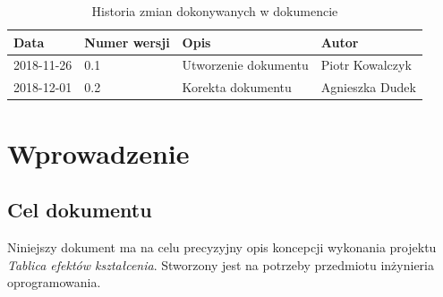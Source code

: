 \documentclass{article}
\begin{document}
\begin{titlepage}






\end{titlepage}

\addtocounter{page}{1}
\newpage

\begin{table}[h!]
	\begin{center}
		\caption{Historia zmian dokonywanych w dokumencie}
		\begin{tabular}{|l|l|l|l|}
			\hline
			Data & Numer wersji & Opis & Autor \\
			\hline \hline
			2018-11-26 & 0.1 & Utworzenie dokumentu & Piotr Kowalczyk \\
			\hline 
			2018-12-01 & 0.2 & Korekta dokumentu & Agnieszka Dudek \\
			\hline
	      \end{tabular}
	\end{center}
\end{table}	

\tableofcontents

\newpage


\section{Wprowadzenie}

\subsection{Cel dokumentu}
Niniejszy dokument ma na celu precyzyjny opis koncepcji wykonania projektu \textit{Tablica efektów kształcenia}.
Stworzony jest na potrzeby przedmiotu inżynieria oprogramowania.
\end{document}
